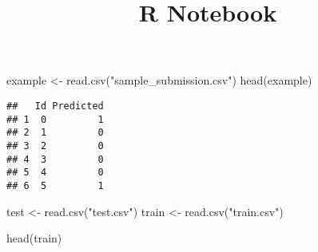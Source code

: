 \documentclass[
]{article}
\title{R Notebook}
\author{}
\date{\vspace{-2.5em}}
\newenvironment{Shaded}{\begin{snugshade}}{\end{snugshade}}
\newcommand{\FunctionTok}[1]{\textcolor[rgb]{0.00,0.00,0.00}{#1}}
\newcommand{\NormalTok}[1]{#1}
\newcommand{\OtherTok}[1]{\textcolor[rgb]{0.56,0.35,0.01}{#1}}
\newcommand{\StringTok}[1]{\textcolor[rgb]{0.31,0.60,0.02}{#1}}
\begin{document}
\maketitle

\begin{Shaded}
\begin{Highlighting}[]
\NormalTok{example }\OtherTok{\textless{}{-}} \FunctionTok{read.csv}\NormalTok{(}\StringTok{"sample\_submission.csv"}\NormalTok{)}
\FunctionTok{head}\NormalTok{(example)}
\end{Highlighting}
\end{Shaded}

\begin{verbatim}
##   Id Predicted
## 1  0         1
## 2  1         0
## 3  2         0
## 4  3         0
## 5  4         0
## 6  5         1
\end{verbatim}

\begin{Shaded}
\begin{Highlighting}[]
\NormalTok{test }\OtherTok{\textless{}{-}} \FunctionTok{read.csv}\NormalTok{(}\StringTok{"test.csv"}\NormalTok{)}
\NormalTok{train }\OtherTok{\textless{}{-}} \FunctionTok{read.csv}\NormalTok{(}\StringTok{"train.csv"}\NormalTok{)}

\FunctionTok{head}\NormalTok{(train)}
\end{Highlighting}
\end{Shaded}
\end{document}
